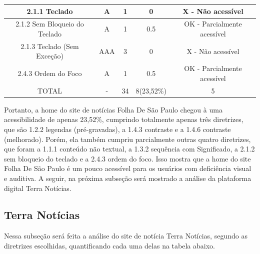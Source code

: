 \documentclass[a4paper]{article}
\begin{document}
\begin{titlepage}
\begin{center}
\begin{longtable}{|c|c|c|c|c|}
		\hline
		2.1.1 Teclado & A & 1 & 0 & X - Não acessível \\
		\hline
		2.1.2 Sem Bloqueio do Teclado & A & 1 & 0.5 & OK - Parcialmente acessível \\
		\hline
		2.1.3 Teclado (Sem Exceção) & AAA & 3 & 0 & X - Não acessível \\
		\hline
		2.4.3 Ordem do Foco & A & 1 & 0.5 & OK - Parcialmente acessível \\
		\hline
		TOTAL & - & 34 & 8(23,52\%) & 5 \\
		\hline
	\end{longtable}
\end{center}

Portanto, a home do site de notícias Folha De São Paulo chegou à uma acessibilidade de apenas 23,52\%, cumprindo totalmente apenas três diretrizes, que são 1.2.2 legendas (pré-gravadas), a 1.4.3 contraste e a 1.4.6 contraste (melhorado). Porém, ela também cumpriu parcialmente outras quatro diretrizes, que foram a 1.1.1 conteúdo não textual, a 1.3.2 sequência com Significado, a 2.1.2 sem bloqueio do teclado e a 2.4.3 ordem do foco. Isso mostra que a home do site Folha De São Paulo é um pouco acessível para os usuários com deficiência visual e auditiva. A seguir, na próxima subseção será mostrado a análise da plataforma digital Terra Notícias.

\subsection{Terra Notícias}

Nessa subseção será feita a análise do site de notícia Terra Notícias, segundo as diretrizes escolhidas, quantificando cada uma delas na tabela abaixo.\\


\end{titlepage}
\end{document}
